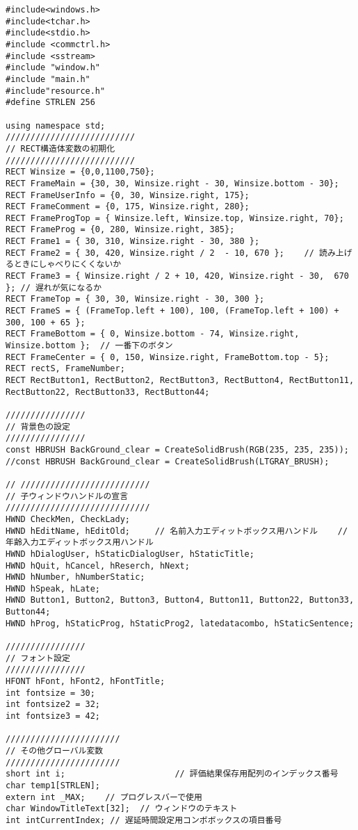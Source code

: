\begin{lstlisting}[caption=window.cpp]
#include<windows.h>
#include<tchar.h>
#include<stdio.h>
#include <commctrl.h> 
#include <sstream>
#include "window.h"
#include "main.h"
#include"resource.h"
#define STRLEN 256

using namespace std;
//////////////////////////
// RECT構造体変数の初期化
//////////////////////////
RECT Winsize = {0,0,1100,750};
RECT FrameMain = {30, 30, Winsize.right - 30, Winsize.bottom - 30};
RECT FrameUserInfo = {0, 30, Winsize.right, 175};
RECT FrameComment = {0, 175, Winsize.right, 280};
RECT FrameProgTop = { Winsize.left, Winsize.top, Winsize.right, 70};
RECT FrameProg = {0, 280, Winsize.right, 385};
RECT Frame1 = { 30, 310, Winsize.right - 30, 380 };
RECT Frame2 = { 30, 420, Winsize.right / 2  - 10, 670 };    // 読み上げるときにしゃべりにくくないか
RECT Frame3 = { Winsize.right / 2 + 10, 420, Winsize.right - 30,  670 }; // 遅れが気になるか
RECT FrameTop = { 30, 30, Winsize.right - 30, 300 };
RECT FrameS = { (FrameTop.left + 100), 100, (FrameTop.left + 100) + 300, 100 + 65 };
RECT FrameBottom = { 0, Winsize.bottom - 74, Winsize.right,  Winsize.bottom };  // 一番下のボタン
RECT FrameCenter = { 0, 150, Winsize.right, FrameBottom.top - 5};
RECT rectS, FrameNumber;
RECT RectButton1, RectButton2, RectButton3, RectButton4, RectButton11, RectButton22, RectButton33, RectButton44;

////////////////
// 背景色の設定
////////////////
const HBRUSH BackGround_clear = CreateSolidBrush(RGB(235, 235, 235));
//const HBRUSH BackGround_clear = CreateSolidBrush(LTGRAY_BRUSH);

// //////////////////////////
// 子ウィンドウハンドルの宣言
/////////////////////////////
HWND CheckMen, CheckLady;      
HWND hEditName, hEditOld;     // 名前入力エディットボックス用ハンドル    // 年齢入力エディットボックス用ハンドル
HWND hDialogUser, hStaticDialogUser, hStaticTitle;
HWND hQuit, hCancel, hReserch, hNext;
HWND hNumber, hNumberStatic;
HWND hSpeak, hLate;
HWND Button1, Button2, Button3, Button4, Button11, Button22, Button33, Button44;
HWND hProg, hStaticProg, hStaticProg2, latedatacombo, hStaticSentence;

////////////////
// フォント設定
////////////////
HFONT hFont, hFont2, hFontTitle;       
int fontsize = 30;  
int fontsize2 = 32;
int fontsize3 = 42;

///////////////////////
// その他グローバル変数
///////////////////////
short int i;                      // 評価結果保存用配列のインデックス番号
char temp1[STRLEN];
extern int _MAX;    // プログレスバーで使用
char WindowTitleText[32];  // ウィンドウのテキスト
int intCurrentIndex; // 遅延時間設定用コンボボックスの項目番号


\end{lstlisting}
